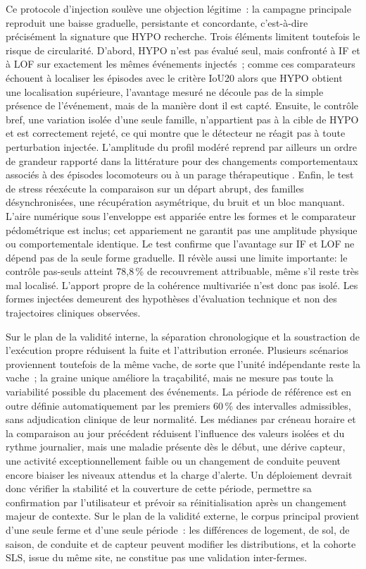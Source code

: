Ce protocole d'injection soulève une objection légitime~: la campagne principale reproduit
une baisse graduelle, persistante et concordante, c'est-à-dire précisément la signature que
HYPO recherche. Trois éléments limitent toutefois le risque de circularité.
D'abord, HYPO n'est pas évalué seul, mais confronté à IF et à LOF sur exactement
les mêmes événements injectés~; comme ces comparateurs échouent à localiser les épisodes avec
le critère IoU20 alors que HYPO obtient une localisation supérieure, l'avantage mesuré ne
découle pas de la simple présence de l'événement, mais de la manière dont il est capté.
Ensuite, le contrôle bref, une variation isolée d'une seule famille, n'appartient pas à la
cible de HYPO et est correctement rejeté, ce qui montre que le détecteur ne réagit pas à toute
perturbation injectée. L'amplitude du profil modéré reprend par ailleurs un ordre de grandeur
rapporté dans la littérature pour des changements comportementaux associés à des épisodes
locomoteurs ou à un parage thérapeutique \citep{paudyal2021lying}. Enfin, le test de stress
réexécute la comparaison sur un départ abrupt, des familles désynchronisées, une récupération
asymétrique, du bruit et un bloc manquant. L'aire numérique sous l'enveloppe est appariée
entre les formes et le comparateur pédométrique est inclus; cet appariement ne garantit pas
une amplitude physique ou comportementale identique. Le test confirme que l'avantage sur IF
et LOF ne dépend pas de la seule forme graduelle. Il révèle aussi une limite importante: le
contrôle pas-seuls atteint 78,8\,\% de recouvrement attribuable, même s'il reste très mal
localisé. L'apport propre de la cohérence multivariée n'est donc pas isolé. Les formes
injectées demeurent des hypothèses d'évaluation technique et non des trajectoires cliniques
observées.

Sur le plan de la validité interne, la séparation chronologique et la soustraction de
l'exécution propre réduisent la fuite et l'attribution erronée. Plusieurs scénarios
proviennent toutefois de la même vache, de sorte que l'unité indépendante reste la vache~; la
graine unique améliore la traçabilité, mais ne mesure pas toute la variabilité possible du
placement des événements. La période de référence est en outre définie automatiquement par les
premiers 60\,\% des intervalles admissibles, sans adjudication clinique de leur normalité. Les
médianes par créneau horaire et la comparaison au jour précédent réduisent l'influence des
valeurs isolées et du rythme journalier, mais une maladie présente dès le début, une dérive
capteur, une activité exceptionnellement faible ou un changement de conduite peuvent encore
biaiser les niveaux attendus et la charge d'alerte. Un déploiement devrait donc vérifier la
stabilité et la couverture de cette période, permettre sa confirmation par l'utilisateur et
prévoir sa réinitialisation après un changement majeur de contexte. Sur le plan de la validité
externe, le corpus principal provient d'une seule ferme et d'une seule période~: les différences
de logement, de sol, de saison, de conduite et de capteur peuvent modifier les distributions,
et la cohorte SLS, issue du même site, ne constitue pas une validation inter-fermes.

